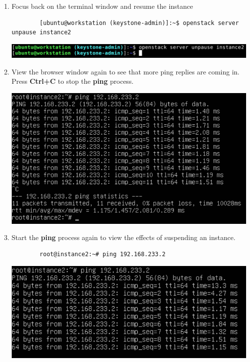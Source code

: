 \documentclass[letterpaper, 12pt]{article}
\begin{document}
\begin{enumerate}
    \item Focus back on the terminal window and resume the instance
    \begin{lstlisting}
        [ubuntu@workstation (keystone-admin)]:~$ openstack server unpause instance2
    \end{lstlisting}

    \begin{center}
        \includegraphics[width=\linewidth]{images/part4/step7.png}
    \end{center}

    \item View the browser window again to see that more ping replies are coming in.
    Press \textbf{Ctrl+C} to stop the \textbf{ping} process.

    \begin{center}
        \includegraphics[width=\linewidth]{images/part4/step8.png}
    \end{center}

    \item Start the \textbf{ping} process again to view the effects of suspending an instance.
    \begin{lstlisting}
        root@instance2:~# ping 192.168.233.2
    \end{lstlisting}

    \begin{center}
        \includegraphics[width=\linewidth]{images/part4/step9.png}
    \end{center}


\end{enumerate}
\end{document}

